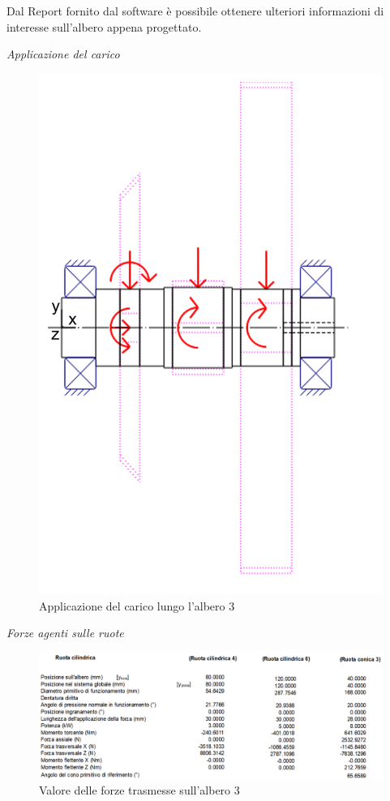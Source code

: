 Dal Report fornito dal software è possibile ottenere ulteriori informazioni di interesse sull'albero appena progettato. 

\emph{Applicazione del carico}
\begin{figure}[h]
    \centering
    \includegraphics[scale=0.5]{Immagini/Carico2Albero3.png}
    \caption{Applicazione del carico lungo l'albero 3}
    \label{fig:Carico2Albero3}
\end{figure}
\newpage
\emph{Forze agenti sulle ruote}
\begin{figure}[h]
    \centering
    \includegraphics[scale=0.5]{Immagini/Forze2RuoteAlbero3.png}
    \caption{Valore delle forze trasmesse sull'albero 3}
    \label{fig:Forze2RuoteAlbero3}
\end{figure}

